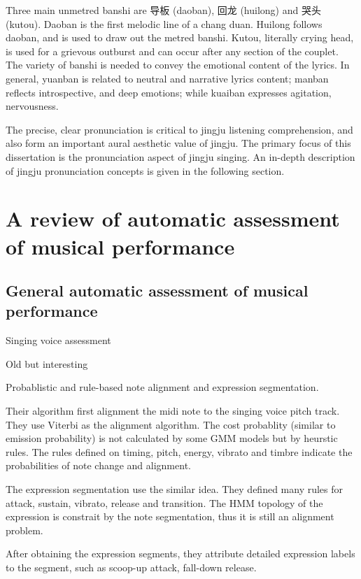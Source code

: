 Three main unmetred banshi are 导板 (daoban), 回龙 (huilong) and 哭头 (kutou). Daoban is the first melodic line of a chang duan. Huilong follows daoban, and is used to draw out the metred banshi. Kutou, literally crying head, is used for a grievous outburst and can occur after any section of the couplet. The variety of banshi is needed to convey the emotional content of the lyrics. In general, yuanban is related to neutral and narrative lyrics content; manban reflects introspective, and deep emotions; while kuaiban expresses agitation, nervousness.

The precise, clear pronunciation is critical to jingju listening comprehension, and also form an important aural aesthetic value of jingju. The primary focus of this dissertation is the pronunciation aspect of jingju singing. An in-depth description of jingju pronunciation concepts is given in the following section.

\section{A review of automatic assessment of musical performance}

\subsection{General automatic assessment of musical performance}

Singing voice assessment

 Old but interesting

Probablistic and rule-based note alignment and expression segmentation.

Their algorithm first alignment the midi note to the singing voice pitch track. They use Viterbi as the alignment algorithm. The cost probablity (similar to emission probability) is not calculated by some GMM models but by heurstic rules. The rules defined on timing, pitch, energy, vibrato and timbre indicate the probabilities of note change and alignment.

The expression segmentation use the similar idea. They defined many rules for attack, sustain, vibrato, release and transition. The HMM topology of the expression is constrait by the note segmentation, thus it is still an alignment problem.

After obtaining the expression segments, they attribute detailed expression labels to the segment, such as scoop-up attack, fall-down release.

